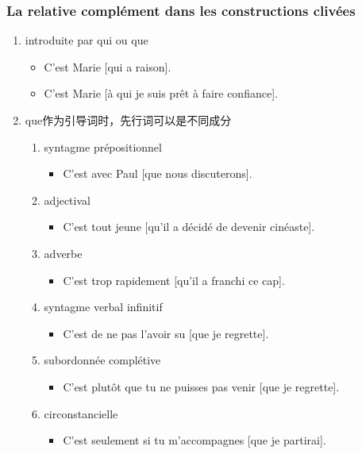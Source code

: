 \documentclass[UTF8]{report}
\begin{document}
\subsubsection{La relative complément dans les constructions clivées}

\begin{enumerate}
    \item introduite par qui ou que
    \begin{itemize}
        \item C’est Marie [qui a raison].
        \item C’est Marie [à qui je suis prêt à faire confiance].
    \end{itemize}
    \item que作为引导词时，先行词可以是不同成分
    \begin{enumerate}
        \item syntagme prépositionnel
        \begin{itemize}
            \item C’est avec Paul [que nous discuterons].
        \end{itemize}
        \item adjectival
        \begin{itemize}
            \item C’est tout jeune [qu’il a décidé de devenir cinéaste].
        \end{itemize}
        \item adverbe 
        \begin{itemize}
            \item C’est trop rapidement [qu’il a franchi ce cap].
        \end{itemize}
        \item syntagme verbal infinitif
        \begin{itemize}
            \item C’est de ne pas l’avoir su [que je regrette].
        \end{itemize}
        \item subordonnée complétive
        \begin{itemize}
            \item C’est plutôt que tu ne puisses pas venir [que je regrette].
        \end{itemize}
        \item circonstancielle
        \begin{itemize}
            \item C’est seulement si tu m’accompagnes [que je partirai].
        \end{itemize}
    \end{enumerate}
\end{enumerate}
\end{document}
